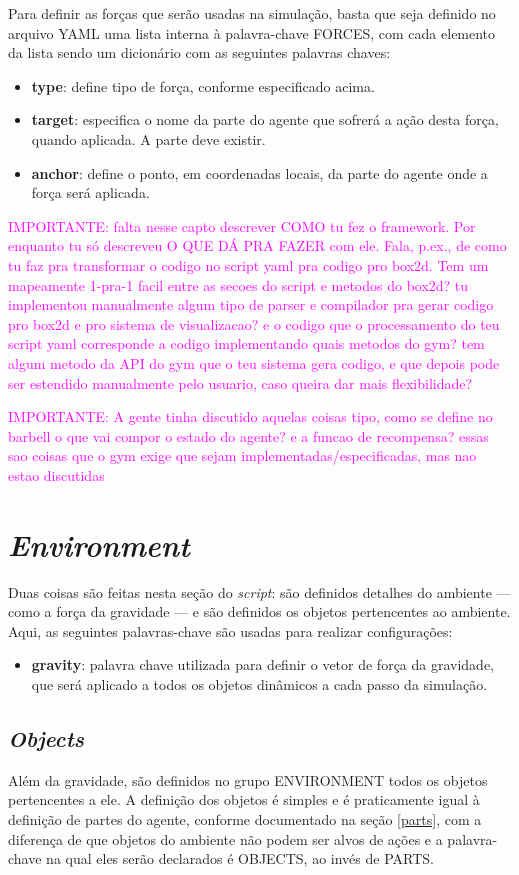\documentclass[cic,tc]{iiufrgs}
\newcommand\bruno[1]{\textcolor{magenta}{#1}}
\begin{document}
Para definir as forças que serão usadas na simulação, basta que seja definido no arquivo YAML uma lista interna à palavra-chave FORCES, com cada elemento
da lista sendo um dicionário com as seguintes palavras chaves:
\begin{itemize}
  \item \textbf{type}: define tipo de força, conforme especificado acima.
  \item \textbf{target}: especifica o nome da parte do agente que sofrerá a ação desta força, quando aplicada. A parte deve existir.
  \item \textbf{anchor}: define o ponto, em coordenadas locais, da parte do agente onde a força será aplicada.
\end{itemize}

\bruno{IMPORTANTE: falta nesse capto descrever COMO tu fez o framework. Por enquanto tu só descreveu O QUE DÁ PRA FAZER com ele. Fala, p.ex., de como tu faz pra transformar o codigo no script yaml pra codigo pro box2d. Tem um mapeamente 1-pra-1 facil entre as secoes do script e metodos do box2d? tu implementou manualmente algum tipo de parser e compilador pra gerar codigo pro box2d e pro sistema de visualizacao? e o codigo que o processamento do teu script yaml corresponde a codigo implementando quais metodos do gym? tem algum metodo da API do gym que o teu sistema gera codigo, e que depois pode ser estendido manualmente pelo usuario, caso queira dar mais flexibilidade?}

\bruno{IMPORTANTE: A gente tinha discutido aquelas coisas tipo, como se define no barbell o que vai compor o estado do agente? e a funcao de recompensa? essas sao coisas que o gym exige que sejam implementadas/especificadas, mas nao estao discutidas}

\section{\textit{Environment}}
Duas coisas são feitas nesta seção do \textit{script}: são definidos detalhes do ambiente --- como a força da gravidade --- e são definidos os objetos
pertencentes ao ambiente. Aqui, as seguintes palavras-chave são usadas para realizar configurações:
\begin{itemize}
  \item \textbf{gravity}: palavra chave utilizada para definir o vetor de força da gravidade, que será aplicado a todos os objetos dinâmicos
  a cada passo da simulação.
\end{itemize}
\subsection{\textit{Objects}}
Além da gravidade, são definidos no grupo ENVIRONMENT todos os objetos pertencentes a ele. A definição dos objetos é simples e é praticamente igual
à definição de partes do agente, conforme documentado na seção \ref{parts}, com a diferença de que objetos do ambiente não podem ser alvos de
ações e a palavra-chave na qual eles serão declarados é OBJECTS, ao invés de PARTS.
\end{document}
